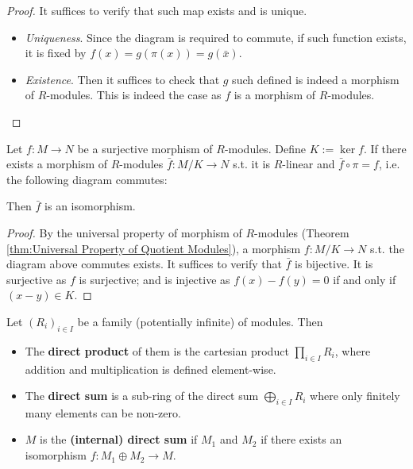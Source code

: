 \begin{proof}
    It suffices to verify that such map exists and is unique.
    \begin{itemize}
        \item \emph{Uniqueness}. Since the diagram is required to commute, if such function exists, it is fixed by $f(x) = g(\pi(x)) = g(\bar{x})$.
        \item \emph{Existence}. Then it suffices to check that $g$ such defined is indeed a morphism of $R$-modules. This is indeed the case as $f$ is a morphism of $R$-modules.
    \end{itemize}
\end{proof}

\begin{theorem}\label{thm:First Isomorphism Theorem}
    Let $f: M\to N$ be a surjective morphism of $R$-modules. Define $K := \ker f$. If there exists a morphism of $R$-modules $\bar{f}: M/K\to N$ s.t. it is $R$-linear and $\bar{f}\circ \pi = f$, i.e. the following diagram commutes:
    
    \begin{minipage}{\linewidth}
        \centering
    \end{minipage}

    Then $\bar{f}$ is an isomorphism.
\end{theorem}

\begin{proof}
    By the universal property of morphism of $R$-modules (Theorem \ref{thm:Universal Property of Quotient Modules}), a morphism $f: M/K\to N$ s.t. the diagram above commutes exists. It suffices to verify that $\bar{f}$ is bijective. It is surjective as $f$ is surjective; and is injective as $f(x) - f(y) = 0$ if and only if $(x - y)\in K$.
\end{proof}

\begin{definition}
    Let $(R_i)_{i\in I}$ be a family (potentially infinite) of modules. Then
    \begin{itemize}
        \item The \textbf{direct product} of them is the cartesian product $\prod_{i\in I} R_i$, where addition and multiplication is defined element-wise.
        \item The \textbf{direct sum} is a sub-ring of the direct sum $\bigoplus_{i\in I} R_i$ where only finitely many elements can be non-zero.
        \item $M$ is the \textbf{(internal) direct sum} if $M_1$ and $M_2$ if there exists an isomorphism $f: M_1 \oplus M_2 \to M$.
    \end{itemize}
\end{definition}

